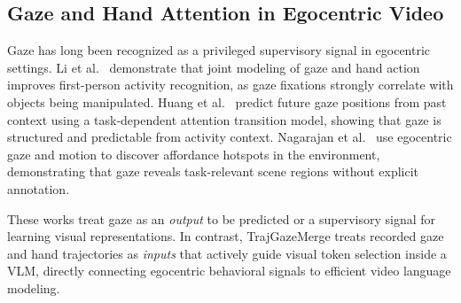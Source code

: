 \subsection{Gaze and Hand Attention in Egocentric Video}

Gaze has long been recognized as a privileged supervisory signal in egocentric settings.
Li et al.~\cite{li2018egtea} demonstrate that joint modeling of gaze and hand action improves
first-person activity recognition, as gaze fixations strongly correlate with objects being
manipulated.
Huang et al.~\cite{huang2018predicting} predict future gaze positions from past context using a
task-dependent attention transition model, showing that gaze is structured and predictable from
activity context.
Nagarajan et al.~\cite{nagarajan2020ego} use egocentric gaze and motion to discover affordance
hotspots in the environment, demonstrating that gaze reveals task-relevant scene regions without
explicit annotation.

These works treat gaze as an \emph{output} to be predicted or a supervisory signal for
learning visual representations.
In contrast, TrajGazeMerge treats recorded gaze and hand trajectories as \emph{inputs} that
actively guide visual token selection inside a VLM, directly connecting egocentric behavioral
signals to efficient video language modeling.
